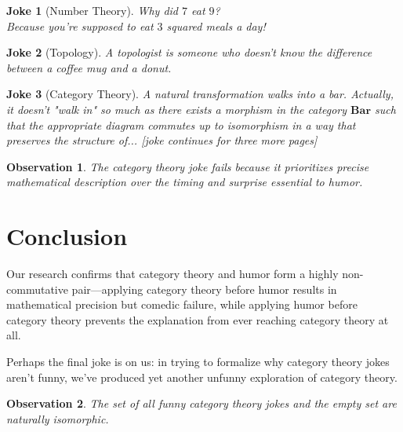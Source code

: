 \documentclass{article}
\newtheorem{joke}{Joke}
\newtheorem{observation}{Observation}
\begin{document}
\begin{joke}[Number Theory]
    Why did $7$ eat $9$?\\
    Because you're supposed to eat $3$ squared meals a day!
\end{joke}

\begin{joke}[Topology]
    A topologist is someone who doesn't know the difference between a coffee mug and a donut.
\end{joke}

\begin{joke}[Category Theory]
    A natural transformation walks into a bar. Actually, it doesn't "walk in" so much as there exists a morphism in the category $\mathbf{Bar}$ such that the appropriate diagram commutes up to isomorphism in a way that preserves the structure of...
    [joke continues for three more pages]
\end{joke}

\begin{observation}
    The category theory joke fails because it prioritizes precise mathematical description over the timing and surprise essential to humor.
\end{observation}

\section{Conclusion}

Our research confirms that category theory and humor form a highly non-commutative pair—applying category theory before humor results in mathematical precision but comedic failure, while applying humor before category theory prevents the explanation from ever reaching category theory at all.

Perhaps the final joke is on us: in trying to formalize why category theory jokes aren't funny, we've produced yet another unfunny exploration of category theory.

\begin{observation}
    The set of all funny category theory jokes and the empty set are naturally isomorphic.
\end{observation}



\end{document}
